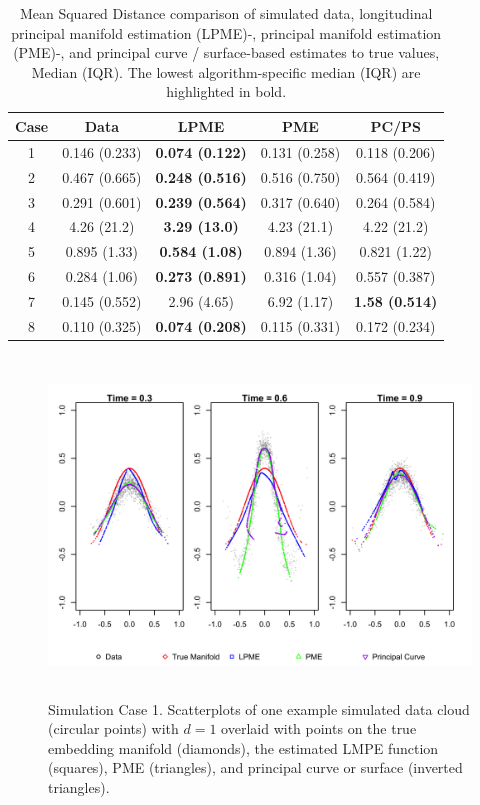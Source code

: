 \documentclass[12pt]{article}
\theoremstyle{definition}
\begin{document}
\begin{table}[h]
  \centering
  \begin{tabular}{|c c c c c|}
    \hline
    Case & Data & LPME & PME & PC/PS \\
    \hline
    1 & 0.146 (0.233) & {\bf 0.074 (0.122)} & 0.131 (0.258) & 0.118 (0.206) \\
    2 & 0.467 (0.665) & {\bf 0.248 (0.516)} & 0.516 (0.750) & 0.564 (0.419) \\
    3 & 0.291 (0.601) & {\bf 0.239 (0.564)} & 0.317 (0.640) & 0.264 (0.584) \\
    4 & 4.26 (21.2) & {\bf 3.29 (13.0)} & 4.23 (21.1) & 4.22 (21.2) \\
    5 & 0.895 (1.33) & {\bf 0.584 (1.08)} & 0.894 (1.36) & 0.821 (1.22) \\
    6 & 0.284 (1.06) & {\bf 0.273 (0.891)} & 0.316 (1.04) & 0.557 (0.387) \\
    7 & 0.145 (0.552) & 2.96 (4.65) & 6.92 (1.17) & {\bf 1.58 (0.514)} \\
    8 & 0.110 (0.325) & {\bf 0.074 (0.208)} & 0.115 (0.331) & 0.172 (0.234) \\
    \hline
  \end{tabular}
  \caption{{\footnotesize Mean Squared Distance comparison of simulated data, longitudinal principal manifold estimation (LPME)-, principal manifold estimation (PME)-, and principal curve / surface-based estimates to true values, Median (IQR). The lowest algorithm-specific median (IQR) are highlighted in bold.}}
  \label{table:simulation_results_median}
\end{table}

\begin{figure}
  \centering
  \includegraphics[height=9cm]{sim_case1} 
  \caption{{\footnotesize Simulation Case 1. Scatterplots of one example simulated data cloud (circular points) with $d=1$ overlaid with points on the true embedding manifold (diamonds), the estimated LMPE function (squares), PME (triangles), and principal curve or surface (inverted triangles).}}
  \label{fig:sim_case1}
\end{figure}
\end{document}
